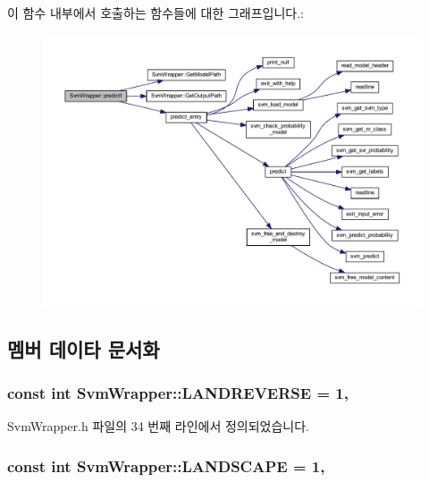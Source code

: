 이 함수 내부에서 호출하는 함수들에 대한 그래프입니다.\+:
\nopagebreak
\begin{figure}[H]
\begin{center}
\leavevmode
\includegraphics[width=350pt]{class_svm_wrapper_a454766365e910aa34b39dbba67d5caaf_cgraph}
\end{center}
\end{figure}




\subsection{멤버 데이타 문서화}
\hypertarget{class_svm_wrapper_a110ad1be7ec6ee74987b023d96b1b9f2}{
\subsubsection[{L\+A\+N\+D\+R\+E\+V\+E\+R\+S\+E}]{\setlength{\rightskip}{0pt plus 5cm}const int Svm\+Wrapper\+::\+L\+A\+N\+D\+R\+E\+V\+E\+R\+S\+E = 1\hspace{0.3cm}{\ttfamily [static]}, {\ttfamily [private]}}}\label{class_svm_wrapper_a110ad1be7ec6ee74987b023d96b1b9f2}


Svm\+Wrapper.\+h 파일의 34 번째 라인에서 정의되었습니다.

\hypertarget{class_svm_wrapper_a00905fc7b3ee662dc4ae5aabb5e2aadc}{
\subsubsection[{L\+A\+N\+D\+S\+C\+A\+P\+E}]{\setlength{\rightskip}{0pt plus 5cm}const int Svm\+Wrapper\+::\+L\+A\+N\+D\+S\+C\+A\+P\+E = 1\hspace{0.3cm}{\ttfamily [static]}, {\ttfamily [private]}}}\label{class_svm_wrapper_a00905fc7b3ee662dc4ae5aabb5e2aadc}


